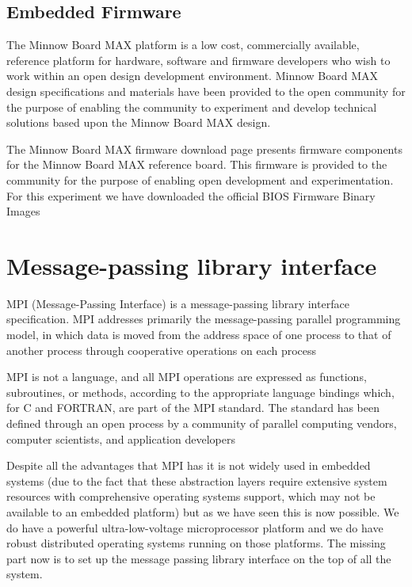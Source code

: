 \subsection{Embedded Firmware}

The Minnow Board MAX platform is a low cost, commercially available, reference
platform for hardware, software and firmware developers who wish to work within
an open design development environment. Minnow Board MAX design specifications
and materials have been provided to the open community for the purpose of
enabling the community to experiment and develop technical solutions based upon
the Minnow Board MAX design.

The Minnow Board MAX firmware download page presents firmware components for the
Minnow Board MAX reference board. This firmware is provided to the community for
the purpose of enabling open development and experimentation. For this
experiment we have downloaded the official BIOS Firmware Binary Images
\cite{minnowmax-firmware}


\section{Message-passing library interface}
\noindent

MPI (Message-Passing Interface) is a message-passing library interface
specification. MPI addresses primarily the message-passing parallel programming
model, in which data is moved from the address space of one process to that of
another process through cooperative operations on each process

MPI is not a language, and all MPI operations are expressed as functions,
subroutines, or methods, according to the appropriate language bindings which,
for C and FORTRAN, are part of the MPI standard. The standard has been defined
through an open process by a community of parallel computing vendors, computer
scientists, and application developers

Despite all the advantages that MPI has it is not widely used in embedded
systems (due to the fact that these abstraction layers require extensive
system resources with comprehensive operating systems support, which may not be
available to an embedded platform) but as we have seen this is now possible. We
do have a powerful ultra-low-voltage microprocessor platform
\cite{minnowboard} and we do have robust distributed operating systems running on
those platforms. The missing part now is to set up the message passing library
interface on the top of all the system. 

